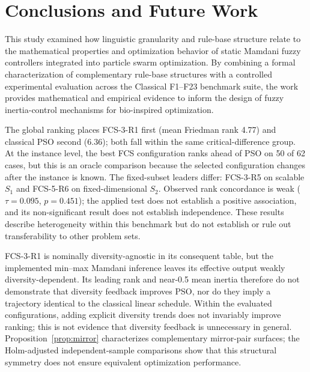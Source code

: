 \section{Conclusions and Future Work}
\label{sec:conclusion}

This study examined how linguistic granularity and rule-base structure relate to the mathematical properties and optimization behavior of static Mamdani fuzzy controllers integrated into particle swarm optimization. By combining a formal characterization of complementary rule-base structures with a controlled experimental evaluation across the Classical F1--F23 benchmark suite, the work provides mathematical and empirical evidence to inform the design of fuzzy inertia-control mechanisms for bio-inspired optimization.

The global ranking places FCS-3-R1 first (mean Friedman rank 4.77) and classical PSO second (6.36); both fall within the same critical-difference group. At the instance level, the best FCS configuration ranks ahead of PSO on 50 of 62 cases, but this is an oracle comparison because the selected configuration changes after the instance is known. The fixed-subset leaders differ: FCS-3-R5 on scalable $S_1$ and FCS-5-R6 on fixed-dimensional $S_2$. Observed rank concordance is weak ($\tau=0.095$, $p=0.451$); the applied test does not establish a positive association, and its non-significant result does not establish independence. These results describe heterogeneity within this benchmark but do not establish or rule out transferability to other problem sets.

FCS-3-R1 is nominally diversity-agnostic in its consequent table, but the implemented min--max Mamdani inference leaves its effective output weakly diversity-dependent. Its leading rank and near-0.5 mean inertia therefore do not demonstrate that diversity feedback improves PSO, nor do they imply a trajectory identical to the classical linear schedule. Within the evaluated configurations, adding explicit diversity trends does not invariably improve ranking; this is not evidence that diversity feedback is unnecessary in general. Proposition~\ref{prop:mirror} characterizes complementary mirror-pair surfaces; the Holm-adjusted independent-sample comparisons show that this structural symmetry does not ensure equivalent optimization performance.

